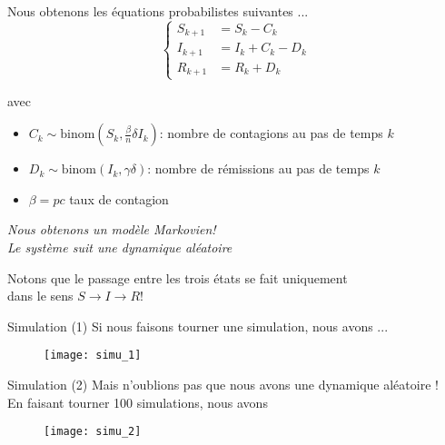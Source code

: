 \documentclass[10pt]{beamer}
\begin{document}
\begin{frame}{Nous obtenons les équations probabilistes suivantes ...}
  \[
    \left\{
      \begin{aligned}
        S_{k+1} &= S_k - C_k \\
        I_{k+1} &= I_k + C_k - D_k \\
        R_{k+1} &= R_k + D_k
      \end{aligned}
    \right.
  \]

  avec
  \begin{itemize}
    \item $C_k\sim \text{binom}(S_k, \frac{\beta}{n}\delta I_k)$: nombre de contagions au pas de temps $k$
    \item $D_k\sim \text{binom}(I_k, \gamma \delta)$: nombre de rémissions au pas de temps $k$
    \item $\beta = p c$ taux de contagion
  \end{itemize}

  \vspace{.3cm}
  \pause
  \begin{center}
    \emph{Nous obtenons un modèle Markovien!\\ Le système suit une dynamique aléatoire}
  \end{center}
  \vspace{.3cm}
  \pause
  Notons que le passage entre les trois états se fait uniquement \\
  dans le sens $S \to I \to R$!
\end{frame}

\begin{frame}{Simulation (1)}
  Si nous faisons tourner une simulation, nous avons ...
  \begin{figure}
    \texttt{[image: simu\_1]}
  \end{figure}
\end{frame}

\begin{frame}{Simulation (2)}
  Mais n'oublions pas que nous avons une dynamique aléatoire ! \\
  En faisant tourner 100 simulations, nous avons
  \begin{figure}
    \texttt{[image: simu\_2]}
  \end{figure}
\end{frame}
\end{document}
